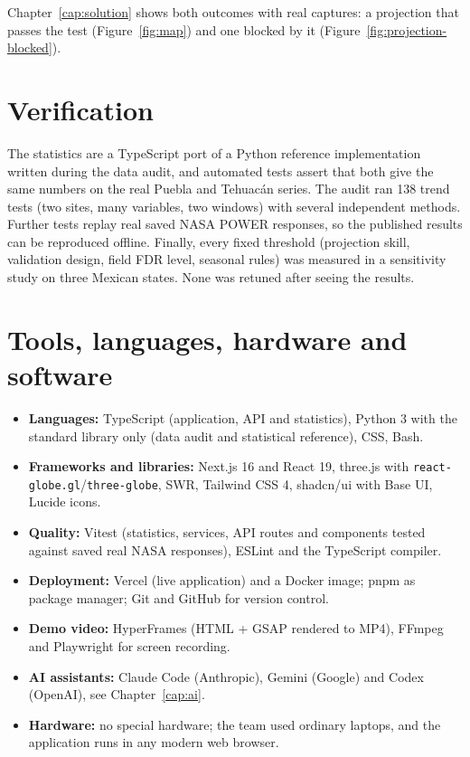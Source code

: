 \documentclass[12pt, oneside, openany]{report}
\begin{document}
Chapter~\ref{cap:solution} shows both outcomes with real captures: a projection that passes the test (Figure~\ref{fig:map}) and one blocked by it (Figure~\ref{fig:projection-blocked}).

\section{Verification}

The statistics are a TypeScript port of a Python reference implementation written during the data audit, and automated tests assert that both give the same numbers on the real Puebla and Tehuacán series. The audit ran 138 trend tests (two sites, many variables, two windows) with several independent methods. Further tests replay real saved NASA POWER responses, so the published results can be reproduced offline. Finally, every fixed threshold (projection skill, validation design, field FDR level, seasonal rules) was measured in a sensitivity study on three Mexican states. None was retuned after seeing the results.

\section{Tools, languages, hardware and software}

\begin{itemize}[leftmargin=*]
    \item \textbf{Languages:} TypeScript (application, API and statistics), Python 3 with the standard library only (data audit and statistical reference), CSS, Bash.
    \item \textbf{Frameworks and libraries:} Next.js 16 and React 19, three.js with \texttt{react-globe.gl}/\texttt{three-globe}, SWR, Tailwind CSS 4, shadcn/ui with Base UI, Lucide icons.
    \item \textbf{Quality:} Vitest (statistics, services, API routes and components tested against saved real NASA responses), ESLint and the TypeScript compiler.
    \item \textbf{Deployment:} Vercel (live application) and a Docker image; pnpm as package manager; Git and GitHub for version control.
    \item \textbf{Demo video:} HyperFrames (HTML + GSAP rendered to MP4), FFmpeg and Playwright for screen recording.
    \item \textbf{AI assistants:} Claude Code (Anthropic), Gemini (Google) and Codex (OpenAI), see Chapter~\ref{cap:ai}.
    \item \textbf{Hardware:} no special hardware; the team used ordinary laptops, and the application runs in any modern web browser.
\end{itemize}
\end{document}

